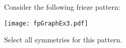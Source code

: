\documentclass{ximera}
\author{Bart Snapp}
\begin{document}
\begin{exercise}
  Consider the following frieze pattern:
  \begin{image}
  \texttt{[image: fpGraphEx3.pdf]}
  \end{image}
  Select all symmetries for this pattern.
  \begin{selectAll}
  \end{selectAll}
\end{exercise}
\end{document}
